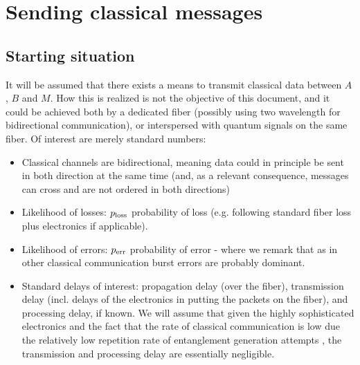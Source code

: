\documentclass{article}
\begin{document}
\section{Sending classical messages}\label{sec:classicalMessages}

\subsection{Starting situation}
It will be assumed that there exists a means to transmit classical data between $A$, $B$ and $M$. How this is realized is not the objective of this document, and it could be achieved both by a dedicated fiber (possibly using two wavelength for bidirectional communication), or interspersed with quantum signals on the same fiber. Of interest are merely standard numbers: 
\begin{itemize}
\item Classical channels are bidirectional, meaning data could in principle be sent in both direction at the same time (and, as a relevant consequence, messages can cross and are not ordered in both directions)
\item Likelihood of losses: $p_{\rm loss}$ probability of loss (e.g. following standard fiber loss plus electronics if applicable).
\item Likelihood of errors:  $p_{\rm err}$ probability of error - where we remark that as in other classical communication burst errors are probably dominant. 
\item Standard delays of interest: propagation delay (over the fiber), transmission delay (incl. delays of the electronics in putting the packets on the fiber), and processing delay, if known. We will assume that given the highly sophisticated electronics and the fact that the rate of classical communication is low due the relatively low repetition rate of entanglement generation attempts , the transmission and processing delay are essentially negligible.
\end{itemize}
\end{document}
